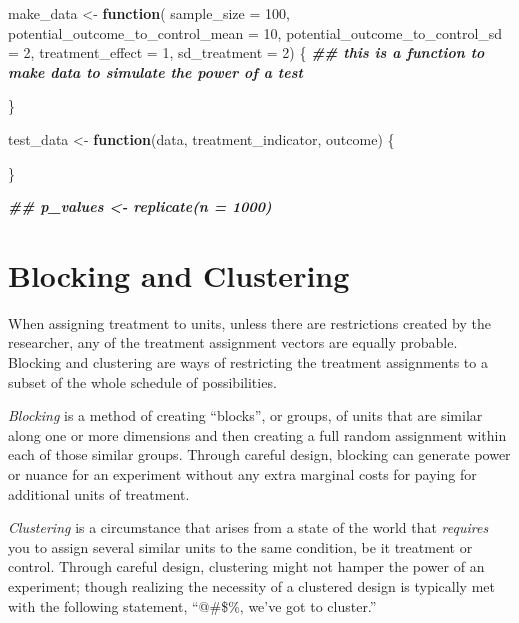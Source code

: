 \documentclass[
]{article}
\newenvironment{Shaded}{\begin{snugshade}}{\end{snugshade}}
\newcommand{\AttributeTok}[1]{\textcolor[rgb]{0.13,0.29,0.53}{#1}}
\newcommand{\ControlFlowTok}[1]{\textcolor[rgb]{0.13,0.29,0.53}{\textbf{#1}}}
\newcommand{\DecValTok}[1]{\textcolor[rgb]{0.00,0.00,0.81}{#1}}
\newcommand{\DocumentationTok}[1]{\textcolor[rgb]{0.56,0.35,0.01}{\textbf{\textit{#1}}}}
\newcommand{\NormalTok}[1]{#1}
\newcommand{\OtherTok}[1]{\textcolor[rgb]{0.56,0.35,0.01}{#1}}
\theoremstyle{definition}
\theoremstyle{definition}
\theoremstyle{definition}
\theoremstyle{definition}
\theoremstyle{remark}
\begin{document}
\begin{Shaded}
\begin{Highlighting}[]
\NormalTok{make\_data }\OtherTok{\textless{}{-}} \ControlFlowTok{function}\NormalTok{(}
  \AttributeTok{sample\_size                       =} \DecValTok{100}\NormalTok{,}
  \AttributeTok{potential\_outcome\_to\_control\_mean =} \DecValTok{10}\NormalTok{,}
  \AttributeTok{potential\_outcome\_to\_control\_sd   =} \DecValTok{2}\NormalTok{, }
  \AttributeTok{treatment\_effect                  =} \DecValTok{1}\NormalTok{, }
  \AttributeTok{sd\_treatment                      =} \DecValTok{2}\NormalTok{) \{ }
  \DocumentationTok{\#\# this is a function to make data to simulate the power of a test}
  
\NormalTok{  \}}
  
\NormalTok{test\_data }\OtherTok{\textless{}{-}} \ControlFlowTok{function}\NormalTok{(data, treatment\_indicator, outcome) \{}
  
\NormalTok{\}}
 
\DocumentationTok{\#\# p\_values \textless{}{-} replicate(n = 1000) }
\end{Highlighting}
\end{Shaded}

\section{Blocking and Clustering}\label{blocking-and-clustering}

When assigning treatment to units, unless there are restrictions created by the researcher, any of the treatment assignment vectors are equally probable. Blocking and clustering are ways of restricting the treatment assignments to a subset of the whole schedule of possibilities.

\emph{Blocking} is a method of creating ``blocks'', or groups, of units that are similar along one or more dimensions and then creating a full random assignment within each of those similar groups. Through careful design, blocking can generate power or nuance for an experiment without any extra marginal costs for paying for additional units of treatment.

\emph{Clustering} is a circumstance that arises from a state of the world that \emph{requires} you to assign several similar units to the same condition, be it treatment or control. Through careful design, clustering might not hamper the power of an experiment; though realizing the necessity of a clustered design is typically met with the following statement, ``@\#\$\%, we've got to cluster.''
\end{document}
